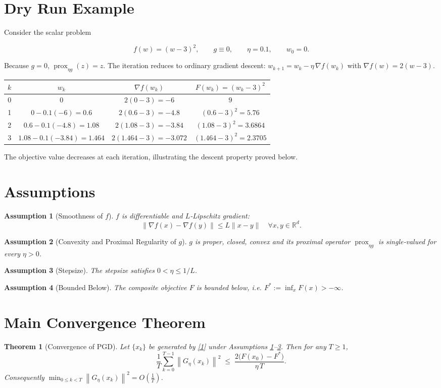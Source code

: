 \documentclass{article}
\newtheorem{theorem}{Theorem}
\newtheorem{assumption}{Assumption}
\newcommand{\prox}{\operatorname{prox}}
\newcommand{\grad}{\nabla}
\newcommand{\R}{\mathbb{R}}
\newcommand{\norm}[1]{\left\|#1\right\|}
\begin{document}
\section*{Dry Run Example}
Consider the scalar problem  

\[
f(w)=(w-3)^{2},\qquad g\equiv0,\qquad \eta=0.1,\qquad w_{0}=0 .
\]

Because $g=0$, $\prox_{\eta g}(z)=z$. The iteration reduces to ordinary gradient descent:
$w_{k+1}=w_{k}-\eta\,\grad f(w_{k})$ with $\grad f(w)=2(w-3)$.

\begin{center}
\begin{tabular}{c|c|c|c}
$k$ & $w_{k}$ & $\grad f(w_{k})$ & $F(w_{k})=(w_{k}-3)^{2}$\\ \hline
0 & $0$ & $2(0-3)=-6$ & $9$\\
1 & $0-0.1(-6)=0.6$ & $2(0.6-3)=-4.8$ & $(0.6-3)^{2}=5.76$\\
2 & $0.6-0.1(-4.8)=1.08$ & $2(1.08-3)=-3.84$ & $(1.08-3)^{2}=3.6864$\\
3 & $1.08-0.1(-3.84)=1.464$ & $2(1.464-3)=-3.072$ & $(1.464-3)^{2}=2.3705$
\end{tabular}
\end{center}
The objective value decreases at each iteration, illustrating the descent property proved below.

\newpage
\section*{Assumptions}
\begin{assumption}[Smoothness of $f$]\label{ass:smooth}
$f$ is differentiable and $L$‑Lipschitz gradient:
\[
\|\grad f(x)-\grad f(y)\|\le L\|x-y\|\quad\forall x,y\in\R^{d}.
\]
\end{assumption}
\begin{assumption}[Convexity and Proximal Regularity of $g$]\label{ass:g}
$g$ is proper, closed, convex and its proximal operator $\prox_{\eta g}$ is single‑valued for every $\eta>0$.
\end{assumption}
\begin{assumption}[Stepsize]\label{ass:step}
The stepsize satisfies $0<\eta\le 1/L$.
\end{assumption}
\begin{assumption}[Bounded Below]\label{ass:bounded}
The composite objective $F$ is bounded below, i.e. $F^{*}:=\inf_{x}F(x)>-\infty$.
\end{assumption}

\section*{Main Convergence Theorem}
\begin{theorem}[Convergence of PGD]\label{thm:main}
Let $\{x_{k}\}$ be generated by \eqref{1} under Assumptions \ref{ass:smooth}–\ref{ass:step}. Then for any $T\ge1$,
\[
\frac{1}{T}\sum_{k=0}^{T-1}\norm{G_{\eta}(x_{k})}^{2}
\;\le\;
\frac{2\bigl(F(x_{0})-F^{*}\bigr)}{\eta\,T}.
\tag{3}
\]
Consequently $\displaystyle\min_{0\le k<T}\norm{G_{\eta}(x_{k})}^{2}=O\!\left(\frac{1}{T}\right)$.
\end{theorem}
\end{document}
